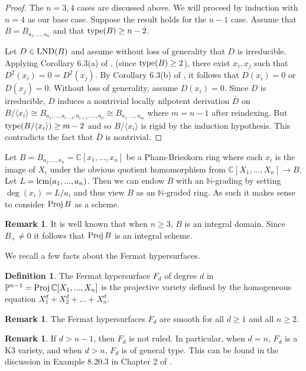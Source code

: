 \documentclass[12pt]{amsart}
\theoremstyle{plain}
\theoremstyle{definition}
\newtheorem{definition}[subsection]{Definition}
\newtheorem{remark}[subsection]{Remark}
\newcommand{\Proj}{		\operatorname{{\rm Proj}}}
\newcommand{\lcm}{		\operatorname{{\rm lcm}}}
\newcommand{\type}{		\operatorname{{\rm type}}}
\newcommand{\lb}{\langle}
\newcommand{\rb}{\rangle}
\newcommand{\Nat}{\ensuremath{\mathbb{N}}}
\newcommand{\Comp}{\ensuremath{\mathbb{C}}}
\newcommand{\proj}{\ensuremath{\mathbb{P}}}
\newcommand{\lnd}{\operatorname{{\rm LND}}}
\newcommand{\isom}{\cong}
\begin{document}
	\begin{proof}
		The $n = 3,4$ cases are discussed above. We will proceed by induction with $n=4$ as our base case. Suppose the result holds for the $n-1$ case. Assume that $B = B_{a_1, ..., a_n}$ and that $\type(B) \geq n-2$. 
		
		Let $D \in \lnd(B)$ and assume without loss of generality that $D$ is irreducible. Applying Corollary 6.3(a) of \cite{LNDsAbelianGroup}, (since $\type(B) \geq 2$), there exist $x_i,x_j$ such that $D^2(x_i) = 0 = D^2(x_j)$. By Corollary 6.3(b) of \cite{LNDsAbelianGroup}, it follows that $D(x_i) = 0$ or $D(x_j) = 0$. Without loss of generality, assume $D(x_i) = 0$. Since $D$ is irreducible, $D$ induces a nontrivial locally nilpotent derivation $\bar{D}$ on $B / \lb x_i \rb \isom B_{a_1,...,a_{i-1},a_{i+1},...,a_n} \isom B_{a_1,...,a_m}$ where $m = n-1$ after reindexing. But $\type(B / \lb x_i \rb) \geq m-2$ and so $B / \lb x_i \rb$ is rigid by the induction hypothesis. This contradicts the fact that $\bar{D}$ is nontrivial.        
	\end{proof}
	
	Let $B = B_{a_1, ..., a_n} = \Comp[x_1, ..., x_n]$ be a Pham-Brieskorn ring where each $x_i$ is the image of $X_i$ under the obvious quotient homomorphism from $\Comp[X_1,...,X_n] \to B$. Let $L = \lcm(a_1, ..., a_n)$. Then we can endow $B$ with an $\Nat$-grading by setting $\deg(x_i) = L/a_i$ and thus view $B$ as an $\Nat$-graded ring. As such it makes sense to consider $\Proj B$ as a scheme. 
	
	\begin{remark} It is well known that when $n \geq 3$, $B$ is an integral domain. Since $B_+ \neq 0$ it follows that $\Proj B$ is an integral scheme.
	\end{remark}
	
	We recall a few facts about the Fermat hypersurfaces. 
	
	\begin{definition} The Fermat hypersurface $F_d$ of degree $d$ in $\proj^{n-1} = \Proj \Comp[X_1, ..., X_n]$ is the projective variety defined by the homogeneous equation $X_1^d + X_2^d + ... + X_n^d$.  
	\end{definition}
	
	\begin{remark} The Fermat hypersurfaces $F_d$ are smooth for all $d \geq 1$ and all $n \geq 2$. 
	\end{remark}
	\begin{remark} \label{notRuled}
		If $d > n-1$, then $F_d$ is not ruled. In particular, when $d=n$, $F_d$ is a K3 variety, and when $d > n$, $F_d$ is of general type. This can be found in the discussion in Example 8.20.3 in Chapter 2 of \cite{Hartshorne}. 
	\end{remark}	
	
\end{document}
